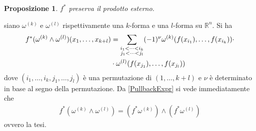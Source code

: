 \documentclass[oneside, 11pt]{amsbook}
\makeatletter
\newcommand{\0}{{(0)}}
\newcommand{\3}{{(3)}}
\theoremstyle{colonplain}
\newtheorem{prop}[thm]{Proposizione}
\theoremstyle{colondefinition}
\theoremstyle{colonremark}
\numberwithin{equation}{chapter}
\renewcommand{\proofname}{Dimostrazione}
\renewenvironment{proof}[1][\proofname]{\par
  \pushQED{\qed}%
  \normalfont \topsep6\p@\@plus6\p@\relax
  \trivlist
  \item[\hskip\labelsep\bfseries #1:]\ignorespaces
}{%
  \popQED\endtrivlist\@endpefalse
}
\makeatother
\begin{document}
\begin{prop} $f^*$ preserva il prodotto esterno.
\end{prop}
\begin{proof} siano $\omega^{(k)}$ e $\omega^{(l)}$ rispettivamente una $k$-forma e una $l$-forma su $\mathbb{R}^n$. Si ha 
\begin{align}\label{PullbackExpr}
    f^*(\omega^{(k)} \wedge \omega^{(l)})(x_1, \dots, x_{k + l}) &= \sum_{\substack{i_1 < \dots < i_k \\ j_1 < \dots < j_l}}(-1)^\nu\omega^{(k)}(f(x_{i_1}), \dots, f(x_{i_k})) \cdot \notag \\
    &\cdot \omega^{(l)}(f(x_{j_1}), \dots, f(x_{j_l})) 
\end{align}
dove $(i_1, \dots, i_k, j_1, \dots, j_l)$ è una permutazione di $(1, \dots, k + l)$ e $\nu$ è determinato in base al segno della permutazione. Da \eqref{PullbackExpr} si vede immediatamente che
\begin{align}
    f^*(\omega^{(k)} \wedge \omega^{(l)}) = (f^*\omega^{(k)}) \wedge (f^*\omega^{(l)}) 
\end{align}
ovvero la tesi. \end{proof}
\end{document}
